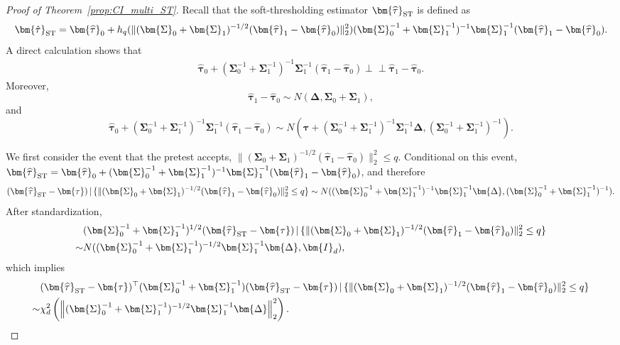 \documentclass[11pt]{article}
\def\given{\,|\,}
\newcommand{\indep}{\perp \!\!\!\perp}
\newcommand{\htau}{\widehat\tau}
\numberwithin{equation}{section}
\theoremstyle{definition}
\begin{document}
\begin{proof}[Proof of Theorem~\ref{prop:CI_multi_ST}]
Recall that the soft-thresholding estimator $\bm{\htau}_{\rm ST}$ is defined as
\[
  \bm{\hat\tau}_{\rm ST} = \bm{\htau}_0 + h_q(\lVert (\bm{\Sigma}_0+ \bm{\Sigma}_1)^{-1/2}(\bm{\htau}_1 - \bm{\htau}_0) \rVert_2^2)(\bm{\Sigma}_0^{-1} + \bm{\Sigma}_1^{-1})^{-1}\bm{\Sigma}_1^{-1}(\bm{\htau}_1 - \bm{\htau}_0).
\]
A direct calculation shows that
\begin{align*}
  \bm{\htau}_0 + (\bm{\Sigma}_0^{-1} + \bm{\Sigma}_1^{-1})^{-1} \bm{\Sigma}_1^{-1} (\bm{\htau}_1 - \bm{\htau}_0) \indep \bm{\htau}_1 - \bm{\htau}_0.
\end{align*}
Moreover,
\[
  \bm{\htau}_1 - \bm{\htau}_0 \sim N(\bm{\Delta}, \bm{\Sigma}_0+ \bm{\Sigma}_1),
\]
and
\[
  \bm{\htau}_0 + (\bm{\Sigma}_0^{-1} + \bm{\Sigma}_1^{-1})^{-1} \bm{\Sigma}_1^{-1} (\bm{\htau}_1 - \bm{\htau}_0) \sim N(\bm{\tau} + (\bm{\Sigma}_0^{-1} + \bm{\Sigma}_1^{-1})^{-1} \bm{\Sigma}_1^{-1} \bm{\Delta}, (\bm{\Sigma}_0^{-1} + \bm{\Sigma}_1^{-1})^{-1} ).
\]

We first consider the event that the pretest accepts, $\lVert (\bm{\Sigma}_0+ \bm{\Sigma}_1)^{-1/2}(\bm{\htau}_1 - \bm{\htau}_0) \rVert_2^2 \le q$. Conditional on this event, $\bm{\htau}_{\rm ST} = \bm{\htau}_0 + (\bm{\Sigma}_0^{-1} + \bm{\Sigma}_1^{-1})^{-1} \bm{\Sigma}_1^{-1} (\bm{\htau}_1 - \bm{\htau}_0) $, and therefore
\begin{align*}
  (\bm{\htau}_{\rm ST} - \bm{\tau}) \given \{\lVert (\bm{\Sigma}_0+ \bm{\Sigma}_1)^{-1/2}(\bm{\htau}_1 - \bm{\htau}_0) \rVert_2^2 \le q\} \sim N((\bm{\Sigma}_0^{-1} + \bm{\Sigma}_1^{-1})^{-1} \bm{\Sigma}_1^{-1} \bm{\Delta}, (\bm{\Sigma}_0^{-1} + \bm{\Sigma}_1^{-1})^{-1} ).
\end{align*}
After standardization,
\begin{align*}
  &(\bm{\Sigma}_0^{-1} + \bm{\Sigma}_1^{-1})^{1/2} (\bm{\htau}_{\rm ST} - \bm{\tau}) \given \{\lVert (\bm{\Sigma}_0+ \bm{\Sigma}_1)^{-1/2}(\bm{\htau}_1 - \bm{\htau}_0) \rVert_2^2 \le q\} \\
  \sim& N((\bm{\Sigma}_0^{-1} + \bm{\Sigma}_1^{-1})^{-1/2} \bm{\Sigma}_1^{-1} \bm{\Delta}, \bm{I}_d),
\end{align*}
which implies
\begin{align*}
  &(\bm{\htau}_{\rm ST} - \bm{\tau})^\top (\bm{\Sigma}_0^{-1} + \bm{\Sigma}_1^{-1}) (\bm{\htau}_{\rm ST} - \bm{\tau}) \given \{\lVert (\bm{\Sigma}_0+ \bm{\Sigma}_1)^{-1/2}(\bm{\htau}_1 - \bm{\htau}_0) \rVert_2^2 \le q\} \\
  \sim& \chi^2_d\left(\left\lVert (\bm{\Sigma}_0^{-1} + \bm{\Sigma}_1^{-1})^{-1/2} \bm{\Sigma}_1^{-1} \bm{\Delta}\right\rVert_2^2\right).
\end{align*}


\end{proof}
\end{document}
